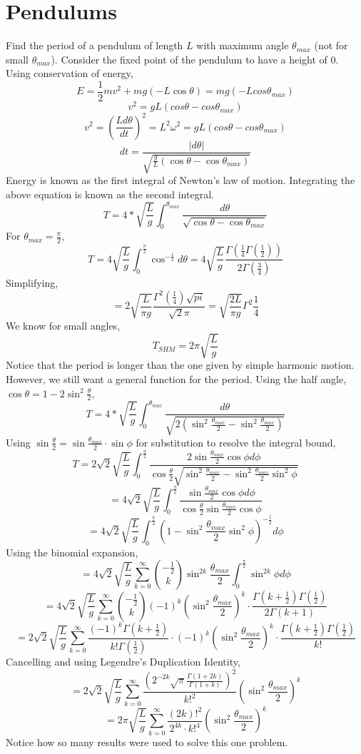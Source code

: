 \documentclass[../main.tex]{subfiles}
\begin{document}
\section{Pendulums}
Find the period of a pendulum of length $L$ with maximum angle $\theta_{max}$ (not for small $\theta_{max}$). Consider the fixed point of the pendulum
to have a height of $0$.
Using conservation of energy,
$$E=\frac{1}{2}mv^{2}+mg(-L\cos\theta)=mg(-Lcos\theta_{max})$$
$$v^{2}=gL(cos\theta-cos\theta_{max})$$
$$v^{2}=\left(\frac{Ld\theta}{dt}\right)^{2}=L^{2}\omega^{2}=gL(cos\theta-cos\theta_{max})$$
$$dt=\frac{|d\theta|}{\sqrt{\frac{g}{L}(\cos\theta - \cos\theta_{max})}}$$
Energy is known as the first integral of Newton's law of motion. Integrating the above equation is known as the second integral.
$$T=4*\sqrt{\frac{L}{g}}\int_{0}^{\theta_{max}}\frac{d\theta}{\sqrt{\cos\theta-\cos\theta_{max}}}$$
For $\theta_{max}=\frac{\pi}{2}$,
$$T=4\sqrt{\frac{L}{g}}\int_{0}^{\frac{\pi}{2}}\cos^{-\frac{1}{2}}d\theta=4\sqrt{\frac{L}{g}}\frac{\Gamma(\frac{1}{4}\Gamma(\frac{1}{2}))}{2\Gamma(\frac{3}{4})}$$
Simplifying,
$$=2\sqrt{\frac{L}{\pi g}}\frac{\Gamma^{2}(\frac{1}{4})\sqrt{pi}}{\sqrt{2}\pi}=\sqrt{\frac{2L}{\pi g}}\Gamma^{2}\frac{1}{4}$$
We know for small angles,
$$T_{SHM}=2\pi\sqrt{\frac{L}{g}}$$
Notice that the period is longer than the one given by simple harmonic motion. However, we still want a general function for the period.
Using the half angle, $\cos\theta=1-2\sin^{2}\frac{\theta}{2}$,
$$T=4*\sqrt{\frac{L}{g}}\int_{0}^{\theta_{max}}\frac{d\theta}{\sqrt{2(\sin^{2}\frac{\theta_{max}}{2}-\sin^{2}\frac{\theta_{max}}{2})}}$$
Using $\sin\frac{\theta}{2}=\sin\frac{\theta_{max}}{2}\cdot\sin\phi$ for substitution to resolve the integral bound,
$$T=2\sqrt{2}\sqrt{\frac{L}{g}}\int_{0}^{\frac{\pi}{2}}\frac{2\sin\frac{\theta_{max}}{2}\cos\phi d\phi}{\cos\frac{\theta}{2}\sqrt{\sin^{2}\frac{\theta_{max}}{2}-\sin^{2}\frac{\theta_{max}}{2}\sin^{2}\phi}}$$
$$=4\sqrt{2}\sqrt{\frac{L}{g}}\int_{0}^{\frac{\pi}{2}}\frac{\sin\frac{\theta_{max}}{2}\cos\phi d\phi}{\cos\frac{\theta}{2}\sin\frac{\theta_{max}}{2}\cos\phi}$$
$$=4\sqrt{2}\sqrt{\frac{L}{g}}\int_{0}^{\frac{\pi}{2}}(1-\sin^{2}\frac{\theta_{max}}{2}\sin^{2}\phi)^{-\frac{1}{2}}d\phi$$
Using the binomial expansion,
$$=4\sqrt{2}\sqrt{\frac{L}{g}}\sum_{k=0}^{\infty}{-\frac{1}{2}\choose k}\sin^{2k}\frac{\theta_{max}}{2}\int_{0}^{\frac{\pi}{2}}\sin^{2k}\phi d\phi$$
$$=4\sqrt{2}\sqrt{\frac{L}{g}}\sum_{k=0}^{\infty}{-\frac{1}{2}\choose k}(-1)^{k}\left(\sin^{2}\frac{\theta_{max}}{2}\right)^{k}\cdot\frac{\Gamma(k+\frac{1}{2})\Gamma(\frac{1}{2})}{2\Gamma(k+1)}$$
$$=2\sqrt{2}\sqrt{\frac{L}{g}}\sum_{k=0}^{\infty}\frac{(-1)^{k}\Gamma(k+\frac{1}{2})}{k!\Gamma(\frac{1}{2})}\cdot(-1)^{k}(\sin^{2}\frac{\theta_{max}}{2})^{k}\cdot\frac{\Gamma(k+\frac{1}{2})\Gamma(\frac{1}{2})}{k!}$$
Cancelling and using Legendre's Duplication Identity,
$$=2\sqrt{2}\sqrt{\frac{L}{g}}\sum_{k=0}^{\infty}\frac{(2^{-2k}\sqrt{\pi}\frac{\Gamma(1+2k)}{\Gamma(1+k)})^{2}}{k!^{2}}(\sin^{2}\frac{\theta_{max}}{2})^{k}$$
$$=2\pi\sqrt{\frac{L}{g}}\sum_{k=0}^{\infty}\frac{(2k)!^{2}}{2^{4k}\cdot k!^{4}}(\sin^{2}\frac{\theta_{max}}{2})^{k}$$
Notice how so many results were used to solve this one problem.
\end{document}
